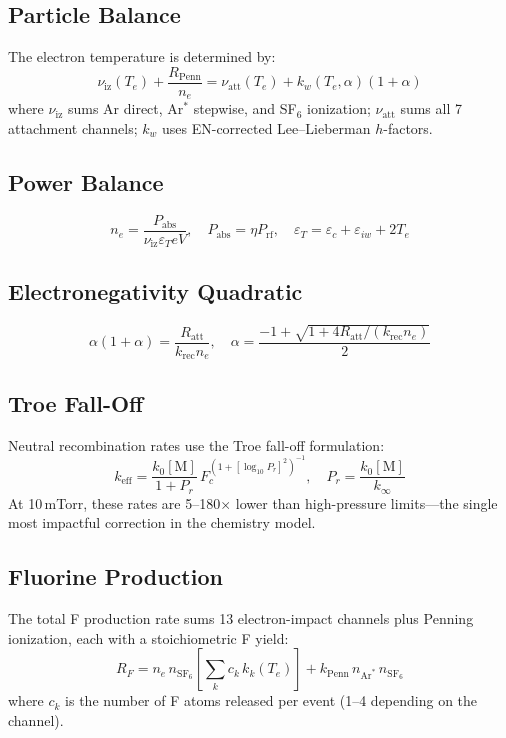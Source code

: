 \documentclass[11pt,a4paper]{article}
\renewcommand{\ne}{n_e}
\newcommand{\Te}{T_e}
\newcommand{\SFsix}{\mathrm{SF}_6}
\newcommand{\Ar}{\mathrm{Ar}}
\begin{document}
\subsection{Particle Balance}

The electron temperature is determined by:
\begin{equation}
\boxed{\nu_{\mathrm{iz}}(\Te) + \frac{R_{\mathrm{Penn}}}{\ne} = \nu_{\mathrm{att}}(\Te) + k_w(\Te, \alpha)(1+\alpha)}
\end{equation}
where $\nu_{\mathrm{iz}}$ sums Ar direct, Ar$^*$ stepwise, and SF$_6$ ionization; $\nu_{\mathrm{att}}$ sums all 7 attachment channels; $k_w$ uses EN-corrected Lee--Lieberman $h$-factors.

\subsection{Power Balance}
\begin{equation}
\boxed{\ne = \frac{P_{\mathrm{abs}}}{\nu_{\mathrm{iz}} \varepsilon_T e V}}, \quad P_{\mathrm{abs}} = \eta P_{\mathrm{rf}}, \quad \varepsilon_T = \varepsilon_c + \varepsilon_{iw} + 2\Te
\end{equation}

\subsection{Electronegativity Quadratic}
\begin{equation}
\alpha(1+\alpha) = \frac{R_{\mathrm{att}}}{k_{\mathrm{rec}}\ne}, \quad \alpha = \frac{-1+\sqrt{1+4R_{\mathrm{att}}/(k_{\mathrm{rec}}\ne)}}{2}
\end{equation}

\subsection{Troe Fall-Off}
Neutral recombination rates use the Troe fall-off formulation:
\begin{equation}
k_{\mathrm{eff}} = \frac{k_0[\mathrm{M}]}{1+P_r}\,F_c^{(1+[\log_{10}P_r]^2)^{-1}}, \quad P_r = \frac{k_0[\mathrm{M}]}{k_\infty}
\end{equation}
At 10\,mTorr, these rates are 5--180$\times$ lower than high-pressure limits---the single most impactful correction in the chemistry model.

\subsection{Fluorine Production}
The total F production rate sums 13 electron-impact channels plus Penning ionization, each with a stoichiometric F yield:
\begin{equation}
R_F = \ne\,n_{\SFsix}\!\left[\sum_k c_k\,k_k(\Te)\right] + k_{\mathrm{Penn}}\,n_{\Ar^*}\,n_{\SFsix}
\end{equation}
where $c_k$ is the number of F atoms released per event (1--4 depending on the channel).
\end{document}
